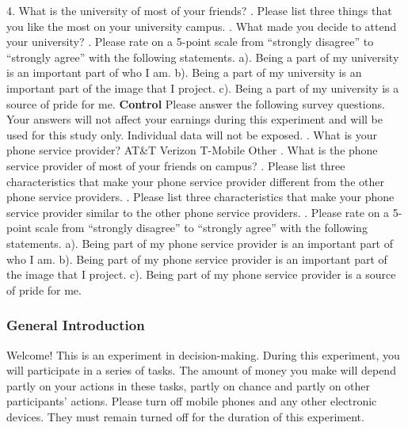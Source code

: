 4. What is the university of most of your friends?
. Please list three things that you like the most on your university campus.
. What made you decide to attend your university? 
. Please rate on a 5-point scale from “strongly disagree” to “strongly agree” with the following statements.
\newline
a). Being a part of my university is an important part of who I am.
\newline
b). Being a part of my university is an important part of the image that I project. 
\newline
c). Being a part of my university is a source of pride for me. 
\newline
\textbf{Control}
\newline
Please answer the following survey questions. Your answers will not affect your earnings during this experiment and will be used for this study only. Individual data will not be exposed.
. What is your phone service provider?  AT\&T    Verizon  T-Mobile Other
. What is the phone service provider of most of your friends on campus?
. Please list three characteristics that make your phone service provider different from the other phone service providers.
. Please list three characteristics that make your phone service provider similar to the other phone service providers.
. Please rate on a 5-point scale from “strongly disagree” to “strongly agree” with the following statements.
\newline
a). Being part of my phone service provider is an important part of who I am.
\newline
b). Being part of my phone service provider is an important part of the image that I project. 
\newline
c). Being part of my phone service provider is a source of pride for me.
\newline

\subsubsection{General Introduction} 
Welcome!  This is an experiment in decision-making.  During this experiment, you will participate in a series of tasks.  The amount of money you make will depend partly on your actions in these tasks, partly on chance and partly on other participants' actions.  Please turn off mobile phones and any other electronic devices.  They must remain turned off for the duration of this experiment.
\newline

